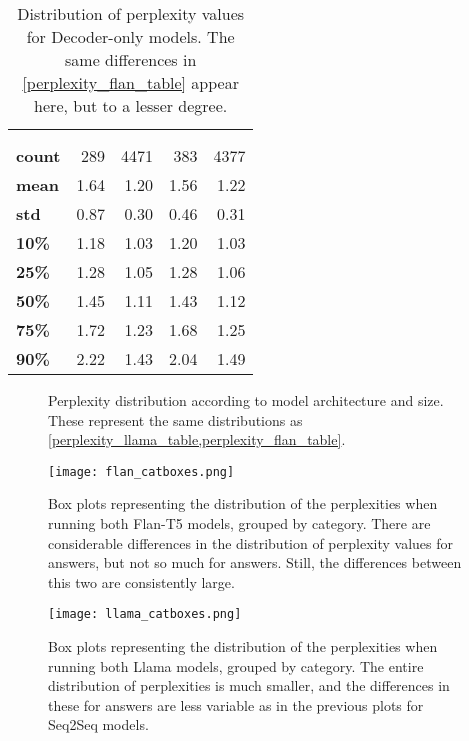 \begin{table}[ht]
	\centering
	\scriptsize
	\begin{tabular}{>{\bfseries}l | r r | r r}
		\toprule
			& \multicolumn{2}{|c}{\smallllama} & \multicolumn{2}{|c}{\bigllama} \\
			& \Parametric{} & \Contextual{} & \Parametric{} & \Contextual{} \\
		\midrule
			count & 289 & 4471 & 383 & 4377 \\
			mean & 1.64 & 1.20 & 1.56 & 1.22 \\
			std & 0.87 & 0.30 & 0.46 & 0.31 \\
			10\% & 1.18 & 1.03 & 1.20 & 1.03 \\
			25\% & 1.28 & 1.05 & 1.28 & 1.06 \\
			50\% & 1.45 & 1.11 & 1.43 & 1.12 \\
			75\% & 1.72 & 1.23 & 1.68 & 1.25 \\
			90\% & 2.22 & 1.43 & 2.04 & 1.49 \\
\bottomrule
	\end{tabular}
	\caption{Distribution of perplexity values for Decoder-only models. The same differences in \cref{perplexity_flan_table} appear here, but to a lesser degree.}
	\label{perplexity_llama_table}
\end{table}

\begin{figure}[H]
	\centering
	\caption{Perplexity distribution according to model architecture and size. These represent the same distributions as \cref{perplexity_llama_table,perplexity_flan_table}.}
	\label{perplexity_results}
\end{figure}

\begin{figure}[p]
	\texttt{[image: flan\_catboxes.png]}
	\caption{Box plots representing the distribution of the perplexities when running both Flan-T5 models, grouped by category. There are considerable differences in the distribution of perplexity values for \Parametric{} answers, but not so much for \Contextual{} answers. Still, the differences between this two are consistently large.}
	\label{flan_catboxes}
\end{figure}

\begin{figure}[p]
	\texttt{[image: llama\_catboxes.png]}
	\caption{Box plots representing the distribution of the perplexities when running both Llama models, grouped by category. The entire distribution of perplexities is much smaller, and the differences in these for \Paramteric{} answers are less variable as in the previous plots for Seq2Seq models.}
	\label{llama_catboxes}
\end{figure}
